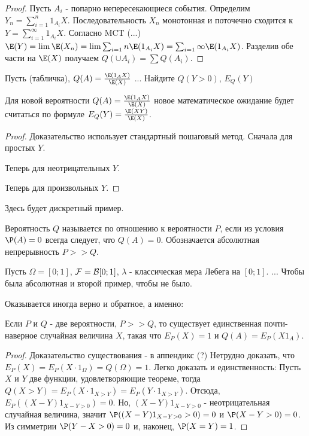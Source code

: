 {\begin{proof}
Пусть $A_{i}$ - попарно непересекающиеся события. Определим $Y_{n}=\sum_{i=1}^{n}1_{A_{i}}X$. Последовательность $X_{n}$ монотонная и поточечно сходится к $Y=\sum_{i=1}^{\infty}1_{A_{i}}X$. Согласно MCT (...) $\E(Y)=\lim \E(X_{n})=\lim \sum_{i=1}{n} \E(1_{A_{i}}X)=\sum_{i=1}{\infty} \E(1_{A_{i}}X)$. Разделив обе части на $\E(X)$ получаем $Q(\cup A_{i})=\sum Q(A_{i})$.
\end{proof}

\begin{myex} Пусть (табличка), $Q(A)=\frac{\E(1_{A}X)}{\E(X)}$
...
Найдите $Q(Y>0)$, $E_{Q}(Y)$
\end{myex}

\begin{myth} Для новой вероятности $Q(A)=\frac{\E(1_{A}X)}{\E(X)}$ новое математическое ожидание будет считаться по формуле $E_{Q}(Y)=\frac{\E(XY)}{\E(X)}$.
\end{myth}
\begin{proof} Доказательство использует стандартный пошаговый метод.
Сначала для простых $Y$.

Теперь для неотрицательных $Y$.

Теперь для произвольных $Y$.
\end{proof}

\begin{myex} Здесь будет дискретный пример.
\end{myex}


\begin{mydef} Вероятность $Q$ называется  по отношению к вероятности $P$, если из условия $\P(A)=0$ всегда следует, что $Q(A)=0$. Обозначается абсолютная непрерывность $P>>Q$. 
\end{mydef}
\begin{myex} Пусть $\Omega=[0;1]$, $\mathcal{F}=\mathcal{B}[0;1]$, $\lambda$ - классическая мера Лебега на $[0;1]$. ... Чтобы была абсолютная и второй пример, чтобы не было.
\end{myex}



Оказывается иногда верно и обратное, а именно: 
\begin{myth} Если $P$ и $Q$ - две вероятности, $P>>Q$, то существует единственная почти-наверное случайная величина $X$, такая что $E_{P}(X)=1$ и $Q(A)=E_{P}(X1_{A})$. 
\end{myth}
\begin{proof} Доказательство существования - в аппендикс (?)
Нетрудно доказать, что $E_{P}(X)=E_{P}(X\cdot 1_{\Omega})=Q(\Omega)=1$. Легко доказать и единственность:
Пусть $X$ и $Y$ две функции, удовлетворяющие теореме, тогда $Q(X>Y)=E_{P}(X\cdot 1_{X>Y})=E_{P}(Y\cdot 1_{X>Y})$. Отсюда, $E_{P}((X-Y)1_{X-Y>0})=0$. Но, $(X-Y)1_{X-Y>0}$ - неотрицательная случайная величина, значит $\P((X-Y)1_{X-Y>0}>0)=0$ и $\P(X-Y>0)=0$. Из симметрии $\P(Y-X>0)=0$ и, наконец, $\P(X=Y)=1$.
\end{proof}

}
